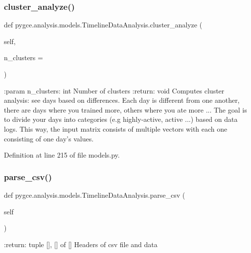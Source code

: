 \subsubsection{\texorpdfstring{cluster\+\_\+analyze()}{cluster\_analyze()}}
{\footnotesize\ttfamily def pygce.\+analysis.\+models.\+Timeline\+Data\+Analysis.\+cluster\+\_\+analyze (\begin{DoxyParamCaption}\item[{}]{self,  }\item[{}]{n\+\_\+clusters = {} }\end{DoxyParamCaption})}

\begin{DoxyVerb}:param n_clusters: int
    Number of clusters
:return: void
    Computes cluster analysis: see days based on differences.
    Each day is different from one another, there are days where you trained more, others where you ate more ...
    The goal is to divide your days into categories (e.g highly-active, active ...) based on data logs.
    This way, the input matrix consists of multiple vectors with each one consisting of one day's values.
\end{DoxyVerb}
 

Definition at line 215 of file models.\+py.

\mbox{\label{classpygce_1_1analysis_1_1models_1_1_timeline_data_analysis_a1a02ca1184152091fc1f66306e1ac02c}} 
\subsubsection{\texorpdfstring{parse\+\_\+csv()}{parse\_csv()}}
{\footnotesize\ttfamily def pygce.\+analysis.\+models.\+Timeline\+Data\+Analysis.\+parse\+\_\+csv (\begin{DoxyParamCaption}\item[{}]{self }\end{DoxyParamCaption})}

\begin{DoxyVerb}:return: tuple [], [] of []
    Headers of csv file and data
\end{DoxyVerb}
 

